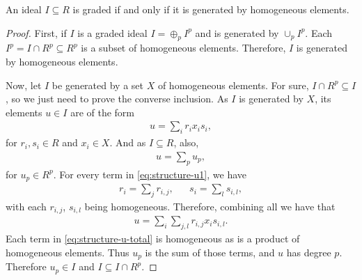 \begin{proposition} \cite[Proposition 4.6]{wang} \label{prop:graded-iff-homo}
    An ideal $ I \subseteq R $ is graded if and only if it is generated by homogeneous elements.
\end{proposition}
\begin{proof}
    First, if $ I $ is a graded ideal $ I = \oplus_p I^p $ and is generated by $ \cup_p I^p $. Each $ I^p = I \cap R^p \subseteq R^p $ is a subset of homogeneous elements. Therefore, $ I $ is generated by homogeneous elements.
    
    Now, let $ I $ be generated by a set $ X $ of homogeneous elements. For sure, $ I \cap R^p \subseteq I $, so we just need to prove the converse inclusion. As $ I $ is generated by $ X $, its elements $ u \in I $ are of the form
    \begin{align}
        u = \sum_i r_i x_i s_i, \label{eq:structure-u1}
    \end{align}
    for $ r_i, s_i \in R $ and $ x_i \in X $. And as $ I \subseteq R $, also,
    \begin{align}
        u = \sum_p u_p,
    \end{align}
    for $ u_p \in R^p $. For every term in \eqref{eq:structure-u1}, we have
    \begin{align}
        r_i = \sum_j r_{i,j}, &  & s_i = \sum_l s_{i,l}, 
    \end{align}
    with each $ r_{i,j} $, $ s_{i,l} $ being homogeneous. Therefore, combining all we have that
    \begin{align}
        u = \sum_i \sum_{j, l} r_{i, j} x_i s_{i, l}. \label{eq:structure-u-total}
    \end{align}
    Each term in \eqref{eq:structure-u-total} is homogeneous as is a product of homogeneous elements. Thus $ u_p $ is the sum of those terms, and $ u $ has degree $ p $. Therefore $ u_p \in I $ and $ I \subseteq I \cap R^p $.
\end{proof}

